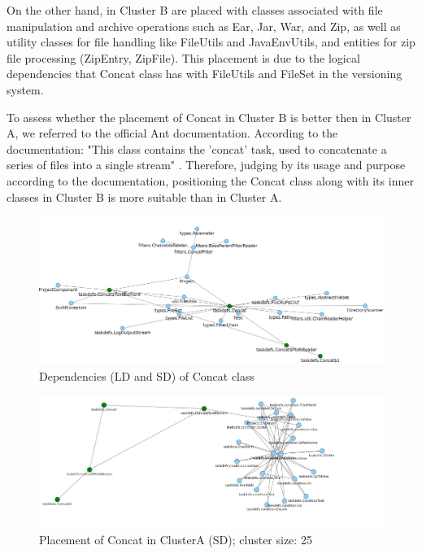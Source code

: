 \documentclass[conference]{IEEEtran}
\begin{document}
On the other hand, in Cluster B are placed with classes associated with file manipulation and archive operations such as Ear, Jar, War, and Zip, as well as utility classes for file handling like FileUtils and JavaEnvUtils, and entities for zip file processing (ZipEntry, ZipFile).  This placement is due to the logical dependencies that Concat class has with FileUtils and FileSet in the versioning system.

To assess whether the placement of Concat in Cluster B is better then in Cluster A, we referred to the official Ant documentation. According to the documentation: "This class contains the 'concat' task, used to concatenate a series of files into a single stream" \cite{ant_concat}. Therefore, judging by its usage and purpose according to the documentation, positioning the Concat class along with its inner classes in Cluster B is more suitable than in Cluster A.


\begin{figure}
\centering
\includegraphics[width=\columnwidth]{dep_concat.png}
\caption{Dependencies (LD and SD) of Concat class}
\label{fig:dep_concat}
\centering
\end{figure}


\begin{figure}
\centering
\includegraphics[width=\columnwidth]{cluster_concatSD.PNG}
\caption{Placement of Concat in ClusterA (SD); cluster size: 25}
\label{fig:clusterAconcat}
\centering
\end{figure}
\end{document}
